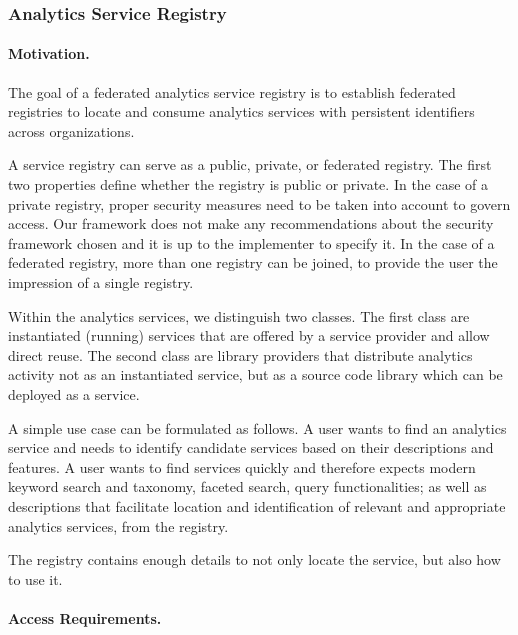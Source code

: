 
\subsubsection{Analytics Service Registry}
\label{sec:registry}

\paragraph*{Motivation.} 

The goal of a federated analytics service registry is to establish
federated registries to locate and consume analytics services with
persistent identifiers across organizations.

A service registry can serve as a public, private, or federated
registry. The first two properties define whether the registry is public or
private. In the case of a private registry, proper security measures need
to be taken into account to govern access. Our framework does not make
any recommendations about the security framework chosen and it is up
to the implementer to specify it. In the case of a federated registry,
more than one registry can be joined, to provide the user the
impression of a single registry.

Within the analytics services, we distinguish two classes. The first
class are instantiated (running) services that are offered by a
service provider and allow direct reuse. The second class are library
providers that distribute analytics activity not as an instantiated
service, but as a source code library which can be deployed as a
service.


A simple use case can be formulated as follows.
A user wants to find an analytics service and needs to
identify candidate services based on their descriptions and
features. A user wants to find services quickly and therefore expects
modern keyword search and taxonomy, faceted search, query
functionalities; as well as descriptions that facilitate location and
identification of relevant and appropriate analytics services, from the
registry.

The registry contains enough details to not only locate the service,
but also how to use it.

\paragraph*{Access Requirements.} 


